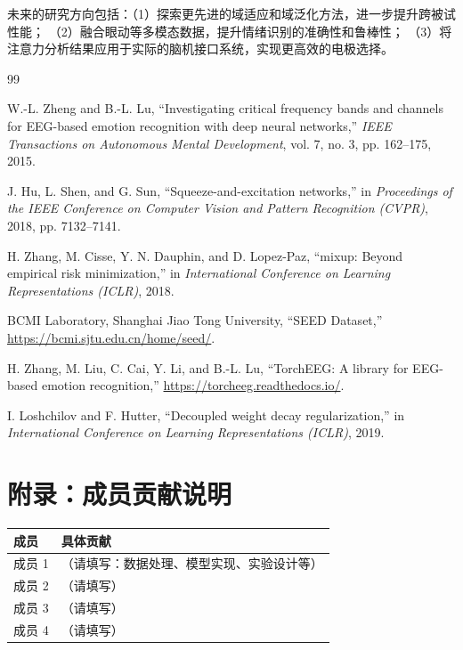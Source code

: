 \documentclass[12pt,a4paper]{ctexart}
\begin{document}
未来的研究方向包括：（1）探索更先进的域适应和域泛化方法，进一步提升跨被试性能；
（2）融合眼动等多模态数据，提升情绪识别的准确性和鲁棒性；
（3）将注意力分析结果应用于实际的脑机接口系统，实现更高效的电极选择。

\begin{thebibliography}{99}

W.-L. Zheng and B.-L. Lu,
``Investigating critical frequency bands and channels for EEG-based emotion recognition with deep neural networks,''
\textit{IEEE Transactions on Autonomous Mental Development}, vol. 7, no. 3, pp. 162--175, 2015.

J. Hu, L. Shen, and G. Sun,
``Squeeze-and-excitation networks,''
in \textit{Proceedings of the IEEE Conference on Computer Vision and Pattern Recognition (CVPR)}, 2018, pp. 7132--7141.

H. Zhang, M. Cisse, Y. N. Dauphin, and D. Lopez-Paz,
``mixup: Beyond empirical risk minimization,''
in \textit{International Conference on Learning Representations (ICLR)}, 2018.

BCMI Laboratory, Shanghai Jiao Tong University,
``SEED Dataset,''
\url{https://bcmi.sjtu.edu.cn/home/seed/}.

H. Zhang, M. Liu, C. Cai, Y. Li, and B.-L. Lu,
``TorchEEG: A library for EEG-based emotion recognition,''
\url{https://torcheeg.readthedocs.io/}.

I. Loshchilov and F. Hutter,
``Decoupled weight decay regularization,''
in \textit{International Conference on Learning Representations (ICLR)}, 2019.

\end{thebibliography}


\newpage
\section*{附录：成员贡献说明}

\begin{table}[H]
\centering
\begin{tabular}{lp{10cm}}
\toprule
\textbf{成员} & \textbf{具体贡献} \\
\midrule
成员 1 & （请填写：数据处理、模型实现、实验设计等） \\
成员 2 & （请填写） \\
成员 3 & （请填写） \\
成员 4 & （请填写） \\
\bottomrule
\end{tabular}
\end{table}
\end{document}
